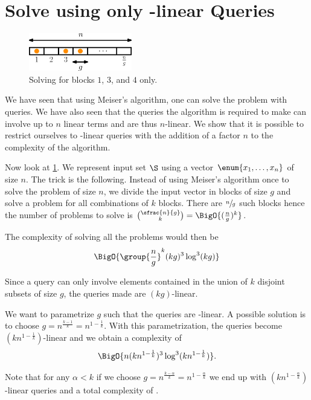 \section{Solve \kSUM using only -linear Queries}


\begin{figure}
\centering
\includegraphics[width=0.4\textwidth]{fig/point-location/blocks}
\caption{Solving \kSUM for blocks \(1\), \(3\), and \(4\) only.}
\label{fig:point-location:on:blocks}
\end{figure}

We have seen that using Meiser's algorithm, one can solve the \kSUM problem
with  queries. We have also seen that the queries the
algorithm is required to make can involve up to \(n\) linear terms and are thus
\(n\)-linear. We show that it is possible to restrict ourselves to
-linear queries with the addition of a factor \(n\) to the complexity
of the algorithm.

Now look at \ref{fig:point-location:on:blocks}. We represent input set \(\S\)
using a vector \(\enum{x_1,\ldots,x_n}\) of size \(n\). The trick is the
following. Instead of using Meiser's algorithm once to solve the problem of
size \(n\), we divide the input vector in blocks of size \(g\) and solve a
\kSUM problem for all combinations of \(k\) blocks. There are \(\sfrac{n}{g}\)
such blocks hence the number of problems to solve is \(\binom{\sfrac{n}{g}}{k}
= \BigO{(\frac{n}{g})^k} \).

The complexity of solving all the problems would then be
\begin{displaymath}
\BigO{\group{\frac{n}{g}}^k (kg)^3 \log^3 (kg) }
\end{displaymath}

Since a query can only involve elements contained in the union of \(k\)
disjoint subsets of size \(g\), the queries made are \((kg)\)-linear.

We want to parametrize \(g\) such that the queries are -linear. A
possible solution is to choose \(g = n^{\frac{k-1}{k}} = n^{1-\frac{1}{k}}\).
With this parametrization, the queries become \((kn^{1-\frac{1}{k}})\)-linear
and we obtain a complexity of
\begin{displaymath}
\BigO{n (kn^{1-\frac{1}{k}})^3 \log^3 (kn^{1-\frac{1}{k}}) }.
\end{displaymath}

Note that for any \(\alpha < k\) if we choose \(g = n^{\frac{k-\alpha}{k}} =
n^{1-\frac{\alpha}{k}}\) we end up with \((kn^{1-\frac{\alpha}{k}})\)-linear
queries and a total complexity of
.

